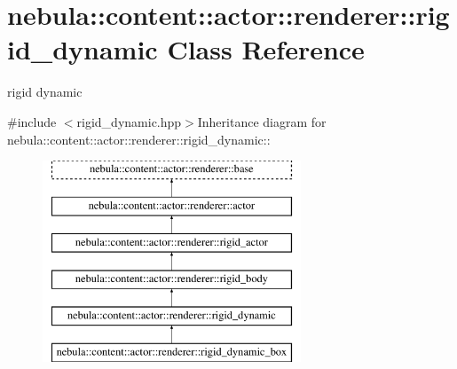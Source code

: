 \hypertarget{classnebula_1_1content_1_1actor_1_1renderer_1_1rigid__dynamic}{
\section{nebula::content::actor::renderer::rigid\_\-dynamic Class Reference}
\label{classnebula_1_1content_1_1actor_1_1renderer_1_1rigid__dynamic}
}


rigid dynamic  


{\ttfamily \#include $<$rigid\_\-dynamic.hpp$>$}Inheritance diagram for nebula::content::actor::renderer::rigid\_\-dynamic::\begin{figure}[H]
\begin{center}
\leavevmode
\includegraphics[height=6cm]{classnebula_1_1content_1_1actor_1_1renderer_1_1rigid__dynamic}
\end{center}
\end{figure}
